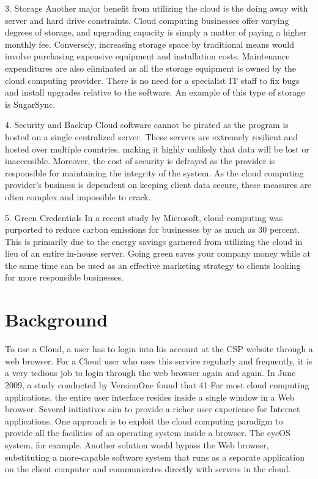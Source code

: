 3. Storage Another major benefit from utilizing the cloud is the doing away with server and hard drive constraints. Cloud computing businesses offer varying degrees of storage, and upgrading capacity is simply a matter of paying a higher monthly fee. Conversely, increasing storage space by traditional means would involve purchasing expensive equipment and installation costs. Maintenance expenditures are also eliminated as all the storage equipment is owned by the cloud computing provider. There is no need for a specialist IT staff to fix bugs and install upgrades relative to the software. An example of this type of storage is SugarSync.

4. Security and Backup Cloud software cannot be pirated as the program is hosted on a single centralized server. These servers are extremely resilient and hosted over multiple countries, making it highly unlikely that data will be lost or inaccessible. Moreover, the cost of security is defrayed as the provider is responsible for maintaining the integrity of the system. As the cloud computing provider’s business is dependent on keeping client data secure, these measures are often complex and impossible to crack.

5. Green Credentials In a recent study by Microsoft, cloud computing was purported to reduce carbon emissions for businesses by as much as 30 percent. This is primarily due to the energy savings garnered from utilizing the cloud in lieu of an entire in-house server. Going green saves your company money while at the same time can be used as an effective marketing strategy to clients looking for more responsible businesses.


\section{Background}

To use a Cloud, a user has to login into his account at the CSP website through a web browser. For a Cloud user who uses this service regularly and frequently, it is a very tedious job to login through the web browser again and again. In June 2009, a study conducted by VersionOne  found that 41%
For  most  cloud computing applications, the entire user interface  resides  inside  a  single  window in  a  Web  browser. Several  initiatives aim  to  provide  a  richer  user  experience  for  Internet  applications.  One approach  is  to  exploit  the  cloud computing  paradigm  to  provide  all  the  facilities of an operating system inside a browser.  The eyeOS system, for example. Another  solution  would bypass  the  Web  browser,  substituting a  more-capable  software  system  that runs  as  a  separate  application on  the client computer and communicates directly with servers in the cloud. 


